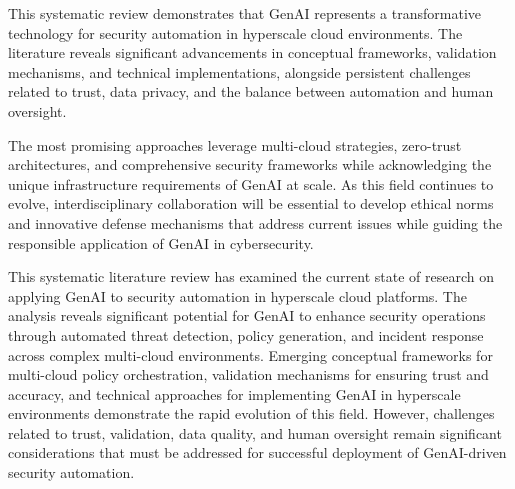 This systematic review demonstrates that GenAI represents a transformative technology for security automation in hyperscale cloud environments. The literature reveals significant advancements in conceptual frameworks, validation mechanisms, and technical implementations, alongside persistent challenges related to trust, data privacy, and the balance between automation and human oversight.

The most promising approaches leverage multi-cloud strategies, zero-trust architectures, and comprehensive security frameworks while acknowledging the unique infrastructure requirements of GenAI at scale. As this field continues to evolve, interdisciplinary collaboration will be essential to develop ethical norms and innovative defense mechanisms that address current issues while guiding the responsible application of GenAI in cybersecurity.

This systematic literature review has examined the current state of research on applying GenAI to security automation in hyperscale cloud platforms. The analysis reveals significant potential for GenAI to enhance security operations through automated threat detection, policy generation, and incident response across complex multi-cloud environments.
Emerging conceptual frameworks for multi-cloud policy orchestration, validation mechanisms for ensuring trust and accuracy, and technical approaches for implementing GenAI in hyperscale environments demonstrate the rapid evolution of this field. However, challenges related to trust, validation, data quality, and human oversight remain significant considerations that must be addressed for successful deployment of GenAI-driven security automation.



